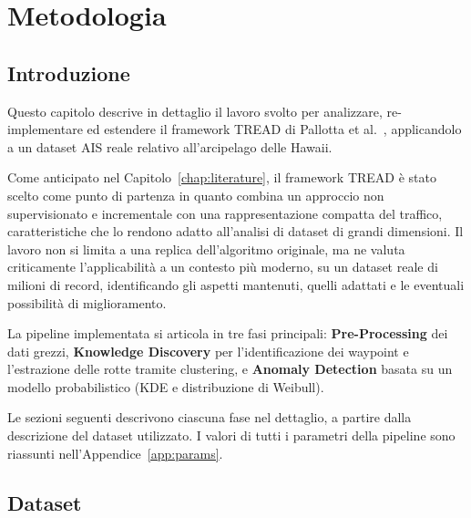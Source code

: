 \chapter{Metodologia}\label{chap:methodology}


\section{Introduzione}\label{sec:meth_intro}

Questo capitolo descrive in dettaglio il lavoro svolto per analizzare,
re-implementare ed estendere il framework TREAD di Pallotta
et al.~\cite{pallotta}, applicandolo a un dataset AIS reale relativo
all'arcipelago delle Hawaii.

Come anticipato nel Capitolo~\ref{chap:literature}, il framework TREAD
è stato scelto come punto di partenza in quanto combina un approccio non
supervisionato e incrementale con una rappresentazione compatta del
traffico, caratteristiche che lo rendono adatto all'analisi di dataset
di grandi dimensioni. Il lavoro non si limita a una replica dell'algoritmo
originale, ma ne valuta criticamente l'applicabilità a un contesto più
moderno, su un dataset reale di milioni di record, identificando gli aspetti mantenuti, quelli adattati
e le eventuali possibilità di miglioramento.

La pipeline implementata si articola in tre fasi principali:
\textbf{Pre-Processing} dei dati grezzi, \textbf{Knowledge Discovery}
per l'identificazione dei waypoint e l'estrazione delle rotte tramite
clustering, e \textbf{Anomaly Detection} basata su un modello
probabilistico (KDE e distribuzione di Weibull).

Le sezioni seguenti descrivono ciascuna fase nel dettaglio, a partire
dalla descrizione del dataset utilizzato.
I valori di tutti i parametri della pipeline sono riassunti nell'Appendice~\ref{app:params}.

\section{Dataset}\label{sec:meth_dataset}

